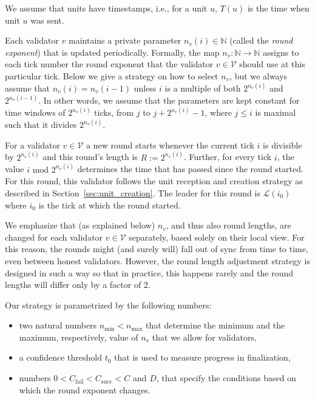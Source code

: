 \documentclass[12pt, fleqn]{article}
\newcommand{\nmin}{n_{\mathrm{min}}}
\newcommand{\nmax}{n_{\mathrm{max}}}
\newcommand{\cV}{\mathcal{V}}
\newcommand{\cL}{\mathcal{L}}
\begin{document}
We assume that units have timestamps, i.e., for a unit $u$, $T(u)$ is the time when unit $u$ was sent.

Each validator $v$ maintains a private parameter $n_v(i) \in \mathbb{N}$ (called the {\it round exponent}) that is updated periodically. Formally, the map $n_v: \mathbb{N} \rightarrow \mathbb{N}$ assigns to each tick number the round exponent that the validator $v\in \cV$ should use at this particular tick.
%
Below we give a strategy on how to select $n_v$, but we always assume that $n_v (i) = n_v (i - 1)$ unless $i$ is a multiple of both $2^{n_v(i)}$ and $2^{n_v(i-1)}$. In other words, we assume that the parameters are kept constant for time windows of $2^{n_v(i)}$ ticks, from $j$ to $j + 2^{n_v(i)} - 1$, where $j \leq i$ is maximal such that it divides $2^{n_v(i)}$. 
%


For a validator $v\in \cV$ a new round starts whenever the current tick $i$ is divisible by $2^{n_v(i)}$ and this round's length is $R:=2^{n_v(i)}$.
%
Further, for every tick $i$, the value $i \mbox{ mod }2^{n_v(i)}$ determines the time that has passed since the round started.
%
For this round, this validator follows the unit reception and creation strategy as described in Section~\ref{sec:unit_creation}.
%
The leader for this round is $\cL(i_0)$ where $i_0$ is the tick at which the round started.

We emphasize that (as explained below) $n_v$, and thus also round lengths, are changed for each validator $v\in \cV$ separately, based solely on their local view.
%
For this reason, the rounds might (and surely will) fall out of sync from time to time, even between honest validators.
%
However, the round length adjustment strategy is designed in such a way so that in practice, this happens rarely and the round lengths will differ only by a factor of $2$.


 Our strategy is parametrized by the following numbers:
\begin{itemize}
    \item two natural numbers $\nmin<\nmax$ that determine the minimum and the maximum, respectively, value of $n_v$ that we allow for validators,
    \item a confidence threshold $t_0$ that is used to measure progress in finalization,
    \item numbers $0<C_{\mathrm{fail}}< C_{\mathrm{succ}} <C$ and $D$, that specify the conditions based on which the round exponent changes.
\end{itemize}
\end{document}

